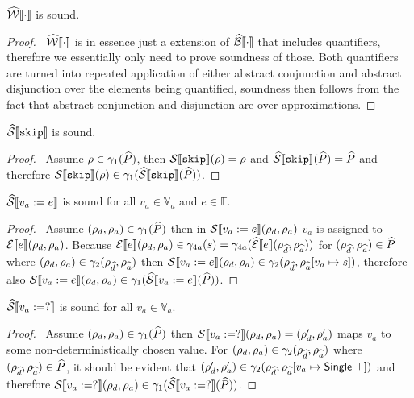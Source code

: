 \begin{conjecture}\label{thm:sound-exp}
    $\widehat{\mathcal{W}}\llbracket \cdot \rrbracket$ is sound.
\end{conjecture}
\begin{proof}
    \pfsketch\
    $\widehat{\mathcal{W}}\llbracket \cdot \rrbracket$ is in essence just a extension of $\widehat{\mathcal{B}}\llbracket \cdot \rrbracket$ that includes quantifiers, therefore we essentially only need to prove soundness of those.
    Both quantifiers are turned into repeated application of either abstract conjunction and abstract disjunction over the elements being quantified, soundness then follows from the fact that abstract conjunction and disjunction are over approximations.
\end{proof}

\begin{conjecture}\label{thm:sound-skip}
    $\widehat{\mathcal{S}} \llbracket \texttt{skip} \rrbracket$ is sound.
\end{conjecture}
\begin{proof}
    \pf\ Assume $\rho \in \gamma_1(\widehat{P})$, then $\mathcal{S} \llbracket \texttt{skip} \rrbracket(\rho) = \rho$ and $\widehat{\mathcal{S}} \llbracket \texttt{skip} \rrbracket(\widehat{P}) = \widehat{P}$ and therefore $\mathcal{S} \llbracket \texttt{skip} \rrbracket(\rho) \in \gamma_1(\widehat{\mathcal{S}} \llbracket \texttt{skip} \rrbracket(\widehat{P}))$.
\end{proof}

\begin{conjecture}\label{thm:sound-assign}
    $\widehat{\mathcal{S}} \llbracket v_a := e \rrbracket$ is sound for all $v_a \in \mathbb{V}_a$ and $e \in \mathbb{E}$.
\end{conjecture}
\begin{proof}
    \pf\
    Assume $(\rho_{d}, \rho_{a}) \in \gamma_1(\widehat{P})$ then in $\mathcal{S} \llbracket v_a := e \rrbracket(\rho_{d}, \rho_{a})$ $v_a$ is assigned to $\mathcal{E}\llbracket e \rrbracket(\rho_{d}, \rho_{a})$. Because $\mathcal{E}\llbracket e \rrbracket(\rho_{d}, \rho_{a}) \in \gamma_{4a}(s) = \gamma_{4a}(\widehat{\mathcal{E}}\llbracket e \rrbracket(\rho_{\widehat{d}}, \rho_{\widehat{a}}))$ for $(\rho_{\widehat{d}}, \rho_{\widehat{a}}) \in \widehat{P}$ where $(\rho_{d}, \rho_{a}) \in \gamma_2(\rho_{\widehat{d}}, \rho_{\widehat{a}})$ then $\mathcal{S} \llbracket v_a := e \rrbracket(\rho_{d}, \rho_{a}) \in \gamma_2(\rho_{\widehat{d}}, \rho_{\widehat{a}}[v_a \mapsto s])$, therefore also $\mathcal{S} \llbracket v_a := e \rrbracket(\rho_{d}, \rho_{a})\in \gamma_1(\widehat{\mathcal{S}} \llbracket v_a := e \rrbracket(\widehat{P}))$.
\end{proof}

\begin{conjecture}\label{thm:sound-random}
    $\widehat{\mathcal{S}} \llbracket v_a := ? \rrbracket$ is sound for all $v_a \in \mathbb{V}_a$.
\end{conjecture}
\begin{proof}
    \pf\
    Assume $(\rho_{d}, \rho_{a}) \in \gamma_1(\widehat{P})$ then $\mathcal{S} \llbracket v_a := ? \rrbracket(\rho_{d}, \rho_{a}) = (\rho_{d}', \rho_{a}')$ maps $v_a$ to some non-deterministically chosen value.
    For $(\rho_{d}, \rho_{a}) \in \gamma_2(\rho_{\widehat{d}}, \rho_{\widehat{a}})$ where $(\rho_{\widehat{d}}, \rho_{\widehat{a}}) \in \widehat{P}$, it should be evident that $(\rho_{d}', \rho_{a}') \in \gamma_2(\rho_{\widehat{d}}, \rho_{\widehat{a}}[v_a \mapsto \mathsf{Single}\;\top])$ and therefore $\mathcal{S} \llbracket v_a := ? \rrbracket(\rho_{d}, \rho_{a}) \in \gamma_1(\widehat{\mathcal{S}} \llbracket v_a := ? \rrbracket(\widehat{P}))$.
\end{proof}

